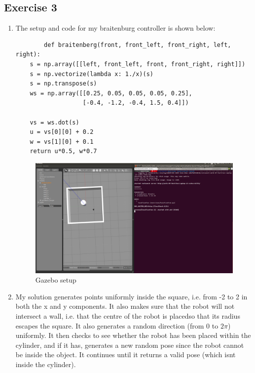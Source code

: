 \documentclass[12pt,a4paper]{article}
\begin{document}
\subsection*{Exercise 3}
\begin{enumerate}[label=(\alph*)]
	\item The setup and code for my braitenburg controller is shown below:\\
	\begin{verbatim}
		def braitenberg(front, front_left, front_right, left, right):
    s = np.array([[left, front_left, front, front_right, right]])
    s = np.vectorize(lambda x: 1./x)(s)
    s = np.transpose(s)
    ws = np.array([[0.25, 0.05, 0.05, 0.05, 0.25],
                   [-0.4, -1.2, -0.4, 1.5, 0.4]])

    vs = ws.dot(s)
    u = vs[0][0] + 0.2
    w = vs[1][0] + 0.1
    return u*0.5, w*0.7

	\end{verbatim}
	\begin{figure}[h!]
		\centering
		\includegraphics[width=\textwidth]{fig/3a.png}
		\caption{Gazebo setup}
		\label{fig:gazebo}
	\end{figure}

	\item My solution generates points uniformly inside the square, i.e. from -2 to 2 in both the x and y components. It also makes sure that the robot will not intersect a wall, i.e. that the centre of the robot is placedso that its radius escapes the square. It also generates a random direction (from 0 to $2\pi$) uniformly. It then checks to see whether the robot has been placed within the cylinder, and if it has, generates a new random pose since the robot cannot be inside the object. It continues until it returns a valid pose (which isnt inside the cylinder). 
	

\end{enumerate}
\end{document}
